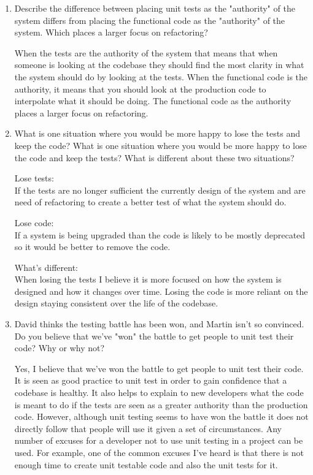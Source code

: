 \begin{enumerate}
\begin{enumerate}
			\item Describe the difference between placing unit tests as the "authority" of the system differs from placing the functional code as the "authority" of the system. Which places a larger focus on refactoring?

				When the tests are the authority of the system that means that when someone is looking at the codebase they should find the most clarity in what the system should do by looking at the tests.  When the functional code is the authority, it means that you should look at the production code to interpolate what it should be doing.  The functional code as the authority places a larger focus on refactoring.

			\item What is one situation where you would be more happy to lose the tests and keep the code? What is one situation where you would be more happy to lose the code and keep the tests? What is different about these two situations?

				Lose tests: \\
				If the tests are no longer sufficient the currently design of the system and are need of refactoring to create a better test of what the system should do.
					
				Lose code: \\
				If a system is being upgraded than the code is likely to be mostly deprecated so it would be better to remove the code.
				
				
				What's different: \\
				When losing the tests I believe it is more focused on how the system is designed and how it changes over time.  Losing the code is more reliant on the design staying consistent over the life of the codebase.

			\item David thinks the testing battle has been won, and Martin isn't so convinced. Do you believe that we've "won" the battle to get people to unit test their code? Why or why not?

				Yes, I believe that we've won the battle to get people to unit test their code.  It is seen as good practice to unit test in order to gain confidence that a codebase is healthy.  It also helps to explain to new developers what the code is meant to do if the tests are seen as a greater authority than the production code. However, although unit testing seems to have won the battle it does not directly follow that people will use it given a set of circumstances.  Any number of excuses for a developer not to use unit testing in a project can be used.  For example, one of the common excuses I've heard is that there is not enough time to create unit testable code and also the unit tests for it.

		\end{enumerate}

\end{enumerate}




